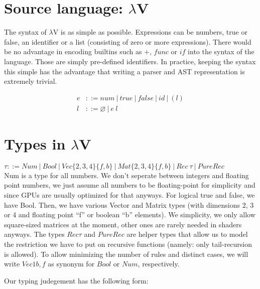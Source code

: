 \documentclass[letterpaper,12pt]{article}
\begin{document}
\section{Source language: $\lambda$V}

The syntax of $\lambda$V is as simple as possible. Expressions
can be numbers, true or false, an identifier or a list (consisting of zero or
more expressions). There would be no advantage in encoding builtins such
as $+$, $func$ or $if$ into the syntax of the language. Those are simply
pre-defined identifiers. In practice, keeping the syntax this simple has 
the advantage that writing a parser and AST representation is extremely trivial.

\begin{align*}
	e &::= num \:|\: true \:|\: false \:|\: \textit{id} \:|\: (l) \\
	l &::= \varnothing \:|\: e\:l
\end{align*}

\section{Types in $\lambda$V}

$\tau ::= Num \:|\: 
	Bool \:|\: 
	Vec\{2, 3, 4\}\{f, b\} \:|\: 
	Mat\{2, 3, 4\}\{f, b\} \:|\: 
	Rec\:\tau \:|\: 
	PureRec$ \\

Num is a type for all numbers. We don't seperate between integers and floating
point numbers, we just assume all numbers to be floating-point for simplicity
and since GPUs are usually optimized for that anyways. For logical true and
false, we have Bool. Then, we have various Vector and Matrix types (with
dimensions 2, 3 or 4 and floating point ``f'' or boolean ``b'' elements).
We simplicity, we only allow square-sized matrices at the moment, other
ones are rarely needed in shaders anyways. 
The types $Rec \tau$ and $PureRec$ are helper types that
allow us to model the restriction we have to put on recursive functions
(namely: only tail-recursion is allowed).
To allow minimizing the number of rules and distinct cases, we will
write $Vec1{b,f}$ as synonym for $Bool$ or $Num$, respectively.

Our typing judegement has the following form: \\
\begin{center}
\end{center}
\end{document}
